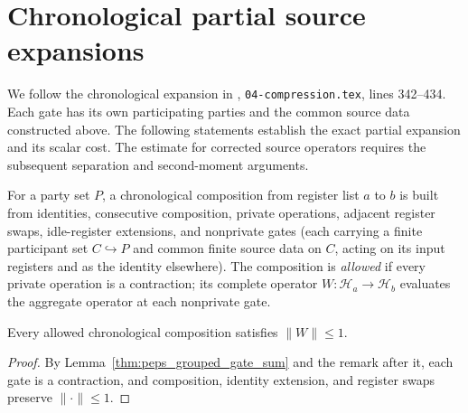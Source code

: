 \section{Chronological partial source expansions}

We follow the chronological expansion in
\cite[proof of Theorem~5.2]{OpenAI2026PolynomialPEPS},
\texttt{04-compression.tex}, lines 342--434. Each gate has its own
participating parties and the common source data constructed above.
The following statements establish the exact partial expansion and
its scalar cost. The estimate for corrected source operators requires
the subsequent separation and second-moment arguments.

\begin{definition}
    \label{def:peps_source_circuit}
    \leanok
    For a party set $P$, a chronological composition from register list $a$ to
    $b$ is built from identities, consecutive composition, private operations,
    adjacent register swaps, idle-register extensions, and nonprivate gates
    (each carrying a finite participant set $C\hookrightarrow P$ and common
    finite source data on $C$, acting on its input registers and as the identity
    elsewhere). The composition is \emph{allowed} if every private operation is
    a contraction; its complete operator $W:\mathcal H_a\to\mathcal H_b$
    evaluates the aggregate operator at each nonprivate gate.
\end{definition}

\begin{lemma}
    \label{thm:peps_source_circuit_norm}
    \leanok
    Every allowed chronological composition satisfies $\|W\|\leq1$.
\end{lemma}

\begin{proof}
    \leanok
    By Lemma~\ref{thm:peps_grouped_gate_sum} and the remark after it, each gate is a contraction,
    and composition, identity extension, and register swaps preserve
    $\|\cdot\|\le1$.
\end{proof}

